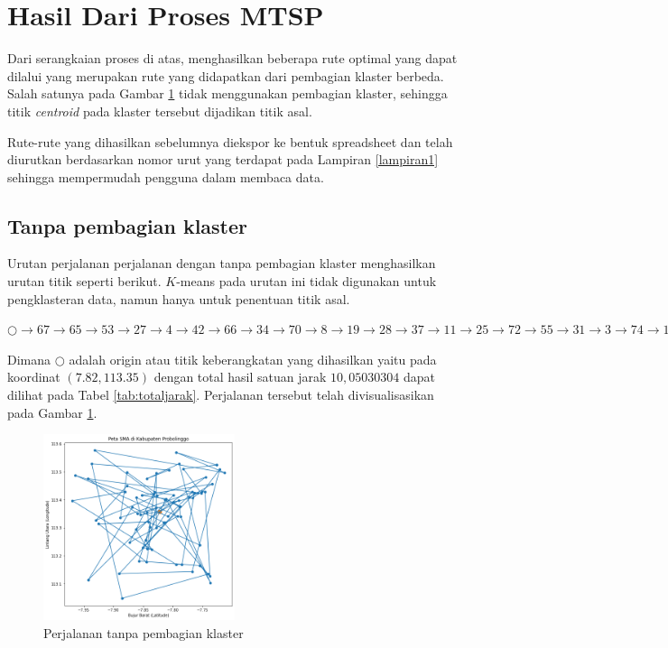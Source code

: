 \section{Hasil Dari Proses MTSP}

Dari serangkaian proses di atas, menghasilkan beberapa rute optimal yang dapat dilalui yang merupakan rute yang didapatkan dari pembagian klaster berbeda. Salah satunya pada Gambar \ref{fig:hasil_mtsp1} tidak menggunakan pembagian klaster, sehingga titik \textit{centroid} pada klaster tersebut dijadikan titik asal.

Rute-rute yang dihasilkan sebelumnya diekspor ke bentuk spreadsheet dan telah diurutkan berdasarkan nomor urut yang terdapat pada Lampiran \ref{lampiran1} sehingga mempermudah pengguna dalam membaca data.

\subsection{Tanpa pembagian klaster}

Urutan perjalanan perjalanan dengan tanpa pembagian klaster menghasilkan urutan titik seperti berikut. $K$-means pada urutan ini tidak digunakan untuk pengklasteran data, namun hanya untuk penentuan titik asal.

\noindent $\bigcirc \to 67 \to 65 \to 53 \to 27\rightarrow4 \to 42 \to 66 \to 34 \to 70 \to 8 \to 19 \to 28 \to 37 \to 11 \to 25 \to 72 \to 55 \to 31 \to 3 \to 74 \to 15 \to 68 \to 20 \to 44 \to 40 \to 16 \to 30 \to 23 \to 24 \to 63 \to 13 \to 29 \to 50 \to 7 \to 54 \to 2 \to 10 \to 52 \to 64 \to 21 \to 62 \to 58 \to 26 \to 1 \to 69 \to 14 \to 45 \to 61 \to 38 \to 59 \to 17 \to 71 \to 18 \to 32 \to 57 \to 73 \to 75 \to 41 \to 39 \to 49 \to 51 \to 6 \to 60 \to 22 \to 33 \to 48 \to 5 \to 35 \to 46 \to 56 \to 36 \to 47 \to 9 \to 12 \to 43 \to \bigcirc$

Dimana $\bigcirc$ adalah origin atau titik keberangkatan yang dihasilkan yaitu pada koordinat $(7.82, 113.35)$ dengan total hasil satuan jarak $10,05030304$ dapat dilihat pada Tabel \ref{tab:totaljarak}. Perjalanan tersebut telah divisualisasikan pada Gambar \ref{fig:hasil_mtsp1}.

\begin{figure}[H]
\centering
\includegraphics[width=0.5\textwidth]{Gambar/hasil_mtsp/1}
\caption{Perjalanan tanpa pembagian klaster}
\label{fig:hasil_mtsp1}
\end{figure}

